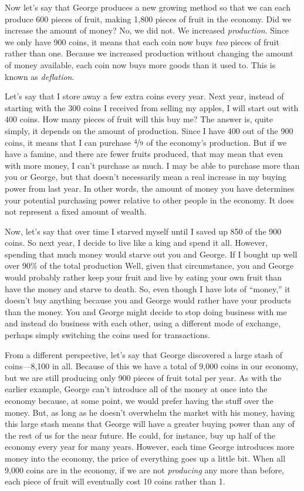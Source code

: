 Now let’s say that George produces a new growing method so that we can
each produce 600 pieces of fruit,
making 1,800 pieces
of fruit in the economy. Did we increase the amount of money?  No, we
did not. We increased \textit{production}. Since we only have 900
coins, it means that each coin now buys \textit{two} pieces of fruit
rather than one.  Because we increased production without changing
the amount of money available, each coin now buys more goods than it
used to.  This is known as \textit{deflation}.

Let’s say that I store away a few extra coins every year. Next year,
instead of starting with the 300 coins I received from selling my
apples, I will start out with 400 coins. How many pieces of fruit will
this buy me? The answer is, quite simply, it depends on the amount of
production. Since I have 400 out of the 900 coins, it means that I can
purchase $\nicefrac{4}{9}$ of the economy’s production. But if we have a famine, and
there are fewer fruits produced, that may mean that even with more
money, I can’t purchase as much. I may be able to purchase more than
you or George, but that doesn’t necessarily mean a real increase in my
buying power from last year.  In other words, the amount of money you
have determines your potential purchasing power relative to other people
in the economy.  It does not represent a fixed amount of wealth.

Now, let’s say that over time I starved myself until I saved up 850 of
the 900 coins. So next year, I decide to live like a king and spend it
all.  However, spending that much money would starve out you and George. If
I bought up well over 90\% of the total production Well,
given that circumstance, you and George would probably rather keep your fruit 
and live by eating your own fruit than have the money and starve to death. 
So, even though I have lots of “money,” it doesn’t buy
anything because you and George would rather have your products than
the money. You and George might decide to stop doing business with me
and instead do business with each other, using a different mode of
exchange, perhaps simply switching the coins used for transactions.

From a different perspective, let’s say that George discovered
a large stash of
coins---8,100 in all. Because of this we have a total of 9,000 coins in our economy,
but we are still producing only 900 pieces of fruit total per year. As with the earlier
example, George can’t introduce all of the money at once into the
economy because, at some point, we would prefer having the stuff over
the money. But, as long as he doesn't overwhelm the market with his money,
having this large stash means that George will have a
greater buying power than any of the rest of us for the near future. He could, for instance,
buy up half of the economy every year for many years.  However, each time George introduces
more money into the economy, the price of everything goes up a little bit.
When all 9,000 coins are in the economy, if we are not \textit{producing}
any more than before, each piece of fruit will eventually cost 10 coins
rather than 1. 

